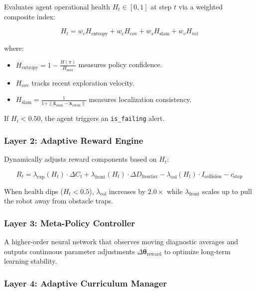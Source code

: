 \documentclass[11pt,a4paper]{article}
\begin{document}
Evaluates agent operational health $H_t \in [0, 1]$ at step $t$ via a weighted composite index:

\begin{equation}
H_t = w_e H_{\text{entropy}} + w_c H_{\text{cov}} + w_s H_{\text{slam}} + w_v H_{\text{vel}}
\end{equation}

where:
\begin{itemize}
    \item $H_{\text{entropy}} = 1 - \frac{H(\pi)}{H_{\max}}$ measures policy confidence.
    \item $H_{\text{cov}}$ tracks recent exploration velocity.
    \item $H_{\text{slam}} = \frac{1}{1 + \|\hat{\mathbf{x}}_{\text{slam}} - \mathbf{x}_{\text{odom}}\|}$ measures localization consistency.
\end{itemize}

If $H_t < 0.50$, the agent triggers an \texttt{is\_failing} alert.

\subsubsection{Layer 2: Adaptive Reward Engine}

Dynamically adjusts reward components based on $H_t$:

\begin{equation}
R_t = \lambda_{\text{exp}}(H_t) \cdot \Delta C_t + \lambda_{\text{front}}(H_t) \cdot \Delta D_{\text{frontier}} - \lambda_{\text{col}}(H_t) \cdot I_{\text{collision}} - c_{\text{step}}
\end{equation}

When health dips ($H_t < 0.5$), $\lambda_{\text{col}}$ increases by $2.0\times$ while $\lambda_{\text{front}}$ scales up to pull the robot away from obstacle traps.

\subsubsection{Layer 3: Meta-Policy Controller}

A higher-order neural network that observes moving diagnostic averages and outputs continuous parameter adjustments $\Delta \boldsymbol{\theta}_{\text{reward}}$ to optimize long-term learning stability.

\subsubsection{Layer 4: Adaptive Curriculum Manager}
\end{document}

